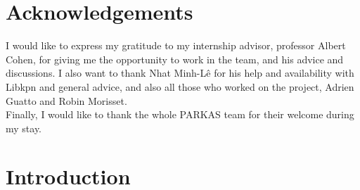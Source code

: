 \documentclass[a4paper,11pt]{article}
\begin{document}
\begin{abstract}

\end{abstract}

\section*{Acknowledgements}
I would like to express my gratitude to my internship advisor, professor Albert Cohen,
for giving me the opportunity to work in the team, and his advice and discussions. I also
want to thank Nhat Minh-L\^e for his help and availability with Libkpn and general advice,
and also all those who worked on the project, Adrien Guatto and Robin Morisset. \\
Finally, I would like to thank the whole PARKAS team for their welcome during my stay.

\clearpage
\newpage

\section{Introduction}
\end{document}
